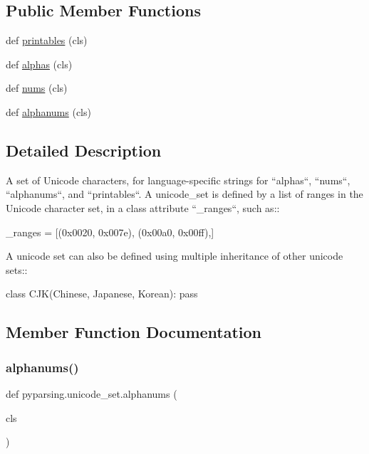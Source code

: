 \subsection*{Public Member Functions}
\begin{DoxyCompactItemize}
\item 
def \hyperlink{classpyparsing_1_1unicode__set_a5ee565396c830e2d84ad7226f230390d}{printables} (cls)
\item 
def \hyperlink{classpyparsing_1_1unicode__set_aa9f08ce787c5c12b9a421680e743eacc}{alphas} (cls)
\item 
def \hyperlink{classpyparsing_1_1unicode__set_aa3dc7b989a48aff2851b04644537cb0a}{nums} (cls)
\item 
def \hyperlink{classpyparsing_1_1unicode__set_a7a184362ef2677fe9e91fe612f9b1eaa}{alphanums} (cls)
\end{DoxyCompactItemize}


\subsection{Detailed Description}
\begin{DoxyVerb}A set of Unicode characters, for language-specific strings for
``alphas``, ``nums``, ``alphanums``, and ``printables``.
A unicode_set is defined by a list of ranges in the Unicode character
set, in a class attribute ``_ranges``, such as::

    _ranges = [(0x0020, 0x007e), (0x00a0, 0x00ff),]

A unicode set can also be defined using multiple inheritance of other unicode sets::

    class CJK(Chinese, Japanese, Korean):
        pass
\end{DoxyVerb}
 

\subsection{Member Function Documentation}
\mbox{\label{classpyparsing_1_1unicode__set_a7a184362ef2677fe9e91fe612f9b1eaa}} 
\subsubsection{\texorpdfstring{alphanums()}{alphanums()}}
{\footnotesize\ttfamily def pyparsing.\+unicode\+\_\+set.\+alphanums (\begin{DoxyParamCaption}\item[{}]{cls }\end{DoxyParamCaption})}


